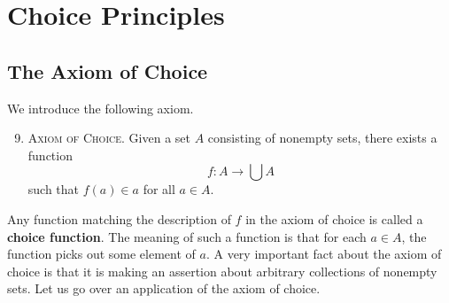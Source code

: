 \section{Choice Principles}\label{ch1sec_choice}

\subsection{The Axiom of Choice}

We introduce the following axiom.

\begin{enumerate}[itemsep=-0.4ex, label=\textup{(ZFC${\arabic*}$)}]\setcounter{enumi}{8}
	\item\textsc{Axiom of Choice.}
	Given a set $A$ consisting of nonempty sets, there exists a function
	\[ f:A\rightarrow\bigcup A \]
	such that $f(a)\in a$ for all $a\in A$. 
\end{enumerate}

Any function matching the description of $f$ in the axiom of choice is called a \textbf{choice function}.
The meaning of such a function is that for each $a\in A$, the function picks out some element of $a$. 
A very important fact about the axiom of choice is that it is making an assertion about arbitrary collections of nonempty sets.
Let us go over an application of the axiom of choice.

